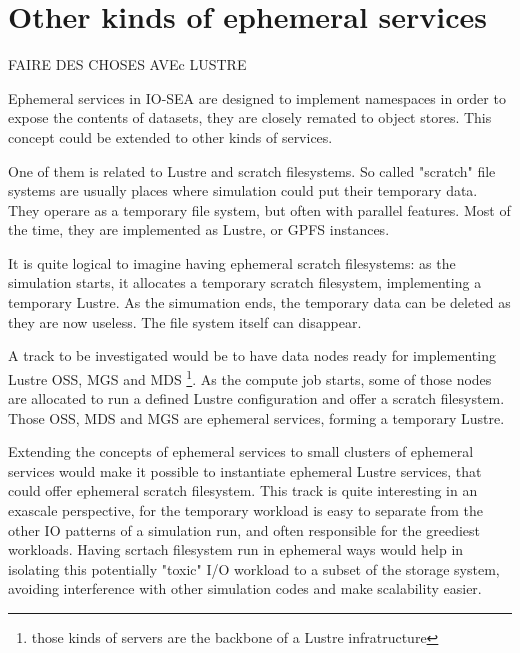 \section{Other kinds of ephemeral services}

FAIRE DES CHOSES AVEc LUSTRE

Ephemeral services in IO-SEA are designed to implement namespaces in order to expose the contents of datasets, 
they are closely remated to object stores. This concept could be extended to other kinds of services.

One of them is related to Lustre and scratch filesystems. So called "scratch" file systems are usually places 
where simulation could put their temporary data. They operare as a temporary file system, but often with parallel
features. Most of the time, they are implemented as Lustre, or GPFS instances. 

It is quite logical to imagine having ephemeral scratch filesystems: as the simulation starts, it allocates a
temporary scratch filesystem, implementing a temporary Lustre. As the simumation ends, the temporary data can
be deleted as they are now useless. The file system itself can disappear. 

A track to be investigated would be to have data nodes ready for implementing Lustre OSS, MGS and MDS
\footnote{those kinds of servers are the backbone of a Lustre infratructure}. As the compute job starts, some
of those nodes are allocated to run a defined Lustre configuration and offer a scratch filesystem. Those
OSS, MDS and MGS are ephemeral services, forming a temporary Lustre. 

Extending the concepts of ephemeral services to small clusters of ephemeral services would make it possible to 
instantiate ephemeral Lustre services, that could offer ephemeral scratch filesystem. This track is quite
interesting in an exascale perspective, for the temporary workload is easy to separate from the other IO patterns
of a simulation run, and often responsible for the greediest workloads. Having scrtach filesystem run in 
ephemeral ways would help in isolating this potentially "toxic" I/O workload to a subset of the storage system,
avoiding interference with other simulation codes and make scalability easier. 
